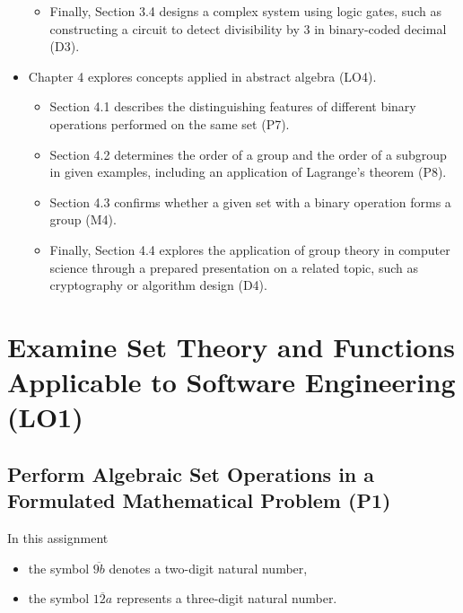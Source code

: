 \documentclass[12pt, a4paper, twoside]{report} %
\renewcommand{\sectionmark}[1]{%
  \markright{\thesection. #1}} %
\begin{document}
\begin{itemize}
\begin{itemize}
    \item Finally, Section 3.4 designs a complex system using logic gates, such as constructing a circuit to detect divisibility by 3 in binary-coded decimal (D3).
  \end{itemize}
  \item Chapter 4 explores concepts applied in abstract algebra (LO4).
  \begin{itemize}
    \item Section 4.1 describes the distinguishing features of different binary operations performed on the same set (P7).
    \item Section 4.2 determines the order of a group and the order of a subgroup in given examples, including an application of Lagrange's theorem (P8).
    \item Section 4.3 confirms whether a given set with a binary operation forms a group (M4).
    \item Finally, Section 4.4 explores the application of group theory in computer science through a prepared presentation on a related topic, such as cryptography or algorithm design (D4).
  \end{itemize}

\end{itemize}




\chapter{Examine Set Theory and Functions Applicable to Software Engineering (LO1)}

\label{chap:LO1}  %

\cite{susanna2020}
\section{Perform Algebraic Set Operations in a Formulated Mathematical Problem (P1)}
\label{sec:P1}
In this assignment
\begin{itemize}
  \item the symbol $\overline{9b}$ denotes a two-digit natural number,
  \item the symbol $\overline{12a}$ represents a three-digit natural number.
\end{itemize}
\end{document}
